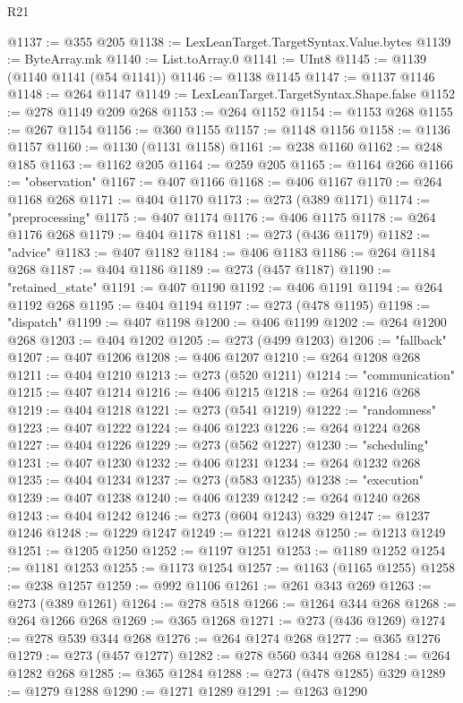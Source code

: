 \begin{lexlean}{R21}
\begin{coremodule}
{{{{{{{{{{{{{{{{{{{@1137 := @355 @205
@1138 := LexLeanTarget.TargetSyntax.Value.bytes
@1139 := ByteArray.mk
@1140 := List.toArray.{0}
@1141 := UInt8
@1145 := @1139 (@1140 @1141 (@54 @1141))
@1146 := @1138 @1145
@1147 := @1137 @1146
@1148 := @264 @1147
@1149 := LexLeanTarget.TargetSyntax.Shape.false
@1152 := @278 @1149 @209 @268
@1153 := @264 @1152
@1154 := @1153 @268
@1155 := @267 @1154
@1156 := @360 @1155
@1157 := @1148 @1156
@1158 := @1136 @1157
@1160 := @1130 (@1131 @1158)
@1161 := @238 @1160
@1162 := @248 @185
@1163 := @1162 @205
@1164 := @259 @205
@1165 := @1164 @266
@1166 := "observation"
@1167 := @407 @1166
@1168 := @406 @1167
@1170 := @264 @1168 @268
@1171 := @404 @1170
@1173 := @273 (@389 @1171)
@1174 := "preprocessing"
@1175 := @407 @1174
@1176 := @406 @1175
@1178 := @264 @1176 @268
@1179 := @404 @1178
@1181 := @273 (@436 @1179)
@1182 := "advice"
@1183 := @407 @1182
@1184 := @406 @1183
@1186 := @264 @1184 @268
@1187 := @404 @1186
@1189 := @273 (@457 @1187)
@1190 := "retained_state"
@1191 := @407 @1190
@1192 := @406 @1191
@1194 := @264 @1192 @268
@1195 := @404 @1194
@1197 := @273 (@478 @1195)
@1198 := "dispatch"
@1199 := @407 @1198
@1200 := @406 @1199
@1202 := @264 @1200 @268
@1203 := @404 @1202
@1205 := @273 (@499 @1203)
@1206 := "fallback"
@1207 := @407 @1206
@1208 := @406 @1207
@1210 := @264 @1208 @268
@1211 := @404 @1210
@1213 := @273 (@520 @1211)
@1214 := "communication"
@1215 := @407 @1214
@1216 := @406 @1215
@1218 := @264 @1216 @268
@1219 := @404 @1218
@1221 := @273 (@541 @1219)
@1222 := "randomness"
@1223 := @407 @1222
@1224 := @406 @1223
@1226 := @264 @1224 @268
@1227 := @404 @1226
@1229 := @273 (@562 @1227)
@1230 := "scheduling"
@1231 := @407 @1230
@1232 := @406 @1231
@1234 := @264 @1232 @268
@1235 := @404 @1234
@1237 := @273 (@583 @1235)
@1238 := "execution"
@1239 := @407 @1238
@1240 := @406 @1239
@1242 := @264 @1240 @268
@1243 := @404 @1242
@1246 := @273 (@604 @1243) @329
@1247 := @1237 @1246
@1248 := @1229 @1247
@1249 := @1221 @1248
@1250 := @1213 @1249
@1251 := @1205 @1250
@1252 := @1197 @1251
@1253 := @1189 @1252
@1254 := @1181 @1253
@1255 := @1173 @1254
@1257 := @1163 (@1165 @1255)
@1258 := @238 @1257
@1259 := @992 @1106
@1261 := @261 @343 @269
@1263 := @273 (@389 @1261)
@1264 := @278 @518
@1266 := @1264 @344 @268
@1268 := @264 @1266 @268
@1269 := @365 @1268
@1271 := @273 (@436 @1269)
@1274 := @278 @539 @344 @268
@1276 := @264 @1274 @268
@1277 := @365 @1276
@1279 := @273 (@457 @1277)
@1282 := @278 @560 @344 @268
@1284 := @264 @1282 @268
@1285 := @365 @1284
@1288 := @273 (@478 @1285) @329
@1289 := @1279 @1288
@1290 := @1271 @1289
@1291 := @1263 @1290
}}}}}}}}}}}}}}}}}}}
\end{coremodule}
\end{lexlean}
